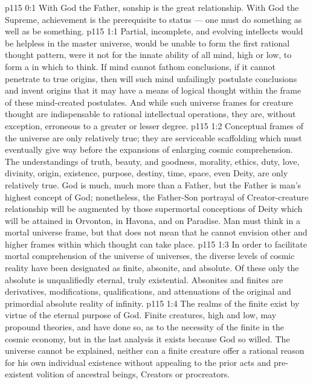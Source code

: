 \author{Mighty Messenger}
\vs p115 0:1 With God the Father, sonship is the great relationship. With God the Supreme, achievement is the prerequisite to status --- one must do something as well as be something.
\vs p115 1:1 Partial, incomplete, and evolving intellects would be helpless in the master universe, would be unable to form the first rational thought pattern, were it not for the innate ability of all mind, high or low, to form a  in which to think. If mind cannot fathom conclusions, if it cannot penetrate to true origins, then will such mind unfailingly postulate conclusions and invent origins that it may have a means of logical thought within the frame of these mind\hyp{}created postulates. And while such universe frames for creature thought are indispensable to rational intellectual operations, they are, without exception, erroneous to a greater or lesser degree.
\vs p115 1:2 Conceptual frames of the universe are only relatively true; they are serviceable scaffolding which must eventually give way before the expansions of enlarging cosmic comprehension. The understandings of truth, beauty, and goodness, morality, ethics, duty, love, divinity, origin, existence, purpose, destiny, time, space, even Deity, are only relatively true. God is much, much more than a Father, but the Father is man’s highest concept of God; nonetheless, the Father\hyp{}Son portrayal of Creator\hyp{}creature relationship will be augmented by those supermortal conceptions of Deity which will be attained in Orvonton, in Havona, and on Paradise. Man must think in a mortal universe frame, but that does not mean that he cannot envision other and higher frames within which thought can take place.
\vs p115 1:3 In order to facilitate mortal comprehension of the universe of universes, the diverse levels of cosmic reality have been designated as finite, absonite, and absolute. Of these only the absolute is unqualifiedly eternal, truly existential. Absonites and finites are derivatives, modifications, qualifications, and attenuations of the original and primordial absolute reality of infinity.
\vs p115 1:4 The realms of the finite exist by virtue of the eternal purpose of God. Finite creatures, high and low, may propound theories, and have done so, as to the necessity of the finite in the cosmic economy, but in the last analysis it exists because God so willed. The universe cannot be explained, neither can a finite creature offer a rational reason for his own individual existence without appealing to the prior acts and pre\hyp{}existent volition of ancestral beings, Creators or procreators.
